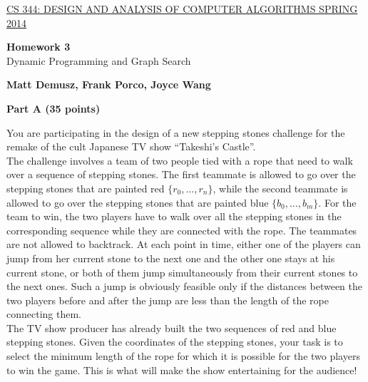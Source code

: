 \documentclass{article}
\begin{document}
\sloppy

\noindent \underline{CS 344: DESIGN AND ANALYSIS OF COMPUTER
  ALGORITHMS \hspace{1.6in} SPRING 2014}

\vspace{0.1in}

\begin{center}
{\bf {\large Homework 3}}\\
Dynamic Programming and Graph Search\\
\end{center}

\begin{center}
{\bf Matt Demusz, Frank Porco, Joyce Wang}
\end{center}

{\bf }

\begin{center}
{\bf Part A (35 points)}
\end{center}

 You are participating in the design of a
new stepping stones challenge for the remake of the cult Japanese TV
show ``Takeshi's Castle''.\\

\noindent The challenge involves a team of two people tied with a rope
that need to walk over a sequence of stepping stones. The first
teammate is allowed to go over the stepping stones that are painted
red $\{r_0, \ldots, r_n\}$, while the second teammate is allowed to go
over the stepping stones that are painted blue $\{b_0, \ldots,
b_m\}$. For the team to win, the two players have to walk over all the
stepping stones in the corresponding sequence while they are connected
with the rope. The teammates are not allowed to backtrack. At each
point in time, either one of the players can jump from her current
stone to the next one and the other one stays at his current stone, or
both of them jump simultaneously from their current stones to the next
ones. Such a jump is obviously feasible only if the distances between
the two players before and after the jump are less than the length of
the rope connecting them.\\

\noindent The TV show producer has already built the two sequences of
red and blue stepping stones. Given the coordinates of the stepping
stones, your task is to select the minimum length of the rope for
which it is possible for the two players to win the game. This is what
will make the show entertaining for the audience!\\
\end{document}
